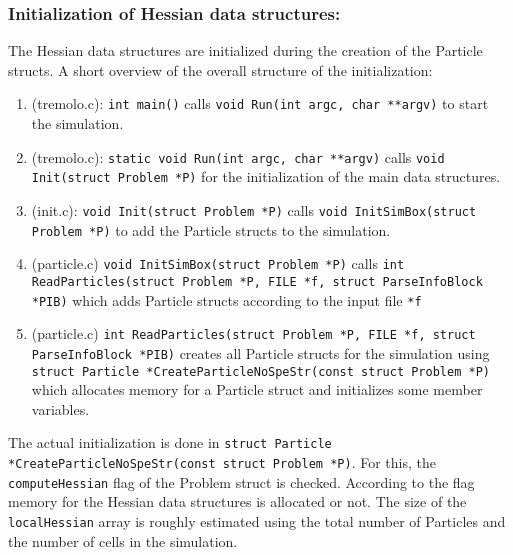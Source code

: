 \documentclass[11pt]{article}
\begin{document}
\subsubsection{Initialization of Hessian data structures:}
\label{sec-1-1-3}
The Hessian data structures are initialized during the creation of the Particle structs. A short overview of the overall structure of the initialization:
\begin{enumerate}
\item (tremolo.c): \texttt{int main()} calls \texttt{void Run(int argc, char **argv)} to start the simulation.
\item (tremolo.c): \texttt{static void Run(int argc, char **argv)} calls \texttt{void Init(struct Problem *P)} for the initialization of the main data structures.
\item (init.c): \texttt{void Init(struct Problem *P)} calls \texttt{void InitSimBox(struct Problem *P)} to add the Particle structs to the simulation.
\item (particle.c) \texttt{void InitSimBox(struct Problem *P)} calls \texttt{int ReadParticles(struct Problem *P, FILE *f, struct ParseInfoBlock *PIB)} which adds Particle structs according to the input file \texttt{*f}
\item (particle.c) \texttt{int ReadParticles(struct Problem *P, FILE *f, struct ParseInfoBlock *PIB)} creates all Particle structs for the simulation using \texttt{struct Particle *CreateParticleNoSpeStr(const struct Problem *P)} which allocates memory for a Particle struct and initializes some member variables.
\end{enumerate}
The actual initialization is done in \texttt{struct Particle *CreateParticleNoSpeStr(const struct Problem *P)}. For this, the \texttt{computeHessian} flag of the Problem struct is checked.
According to the flag memory for the Hessian data structures is allocated or not. The size of the \texttt{localHessian} array is roughly estimated using the total number of Particles and the number of cells in the simulation.
\end{document}
